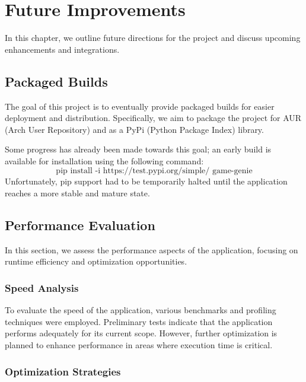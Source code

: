 







\chapter*{Future Improvements}

In this chapter, we outline future directions for the project and discuss upcoming enhancements and integrations.

\section*{Packaged Builds}

The goal of this project is to eventually provide packaged builds for easier deployment and distribution. Specifically, we aim to package the project for AUR (Arch User Repository) and as a PyPi (Python Package Index) library.

Some progress has already been made towards this goal; an early build is available for installation using the following command:
\[
\text{pip install -i https://test.pypi.org/simple/ game-genie}
\]
Unfortunately, pip support had to be temporarily halted until the application reaches a more stable and mature state.

\section*{Performance Evaluation}

In this section, we assess the performance aspects of the application, focusing on runtime efficiency and optimization opportunities.

\subsection*{Speed Analysis}

To evaluate the speed of the application, various benchmarks and profiling techniques were employed. Preliminary tests indicate that the application performs adequately for its current scope. However, further optimization is planned to enhance performance in areas where execution time is critical.

\subsection*{Optimization Strategies}

